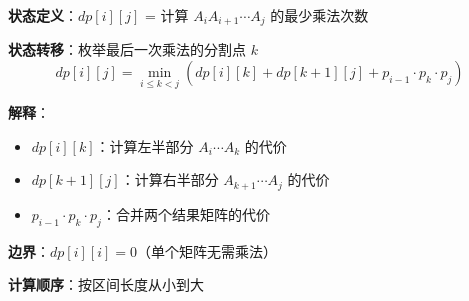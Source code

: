 \documentclass[12pt, a4paper]{ctexart}
\begin{document}
\begin{blackboard}[矩阵链乘法的 DP]

\textbf{状态定义}：$dp[i][j]$ = 计算 $A_i A_{i+1} \cdots A_j$ 的最少乘法次数

\textbf{状态转移}：枚举最后一次乘法的分割点 $k$
\[
dp[i][j] = \min_{i \leq k < j} \left( dp[i][k] + dp[k+1][j] + p_{i-1} \cdot p_k \cdot p_j \right)
\]

\textbf{解释}：
\begin{itemize}
    \item $dp[i][k]$：计算左半部分 $A_i \cdots A_k$ 的代价
    \item $dp[k+1][j]$：计算右半部分 $A_{k+1} \cdots A_j$ 的代价
    \item $p_{i-1} \cdot p_k \cdot p_j$：合并两个结果矩阵的代价
\end{itemize}

\textbf{边界}：$dp[i][i] = 0$（单个矩阵无需乘法）

\textbf{计算顺序}：按区间长度从小到大

\end{blackboard}
\end{document}
